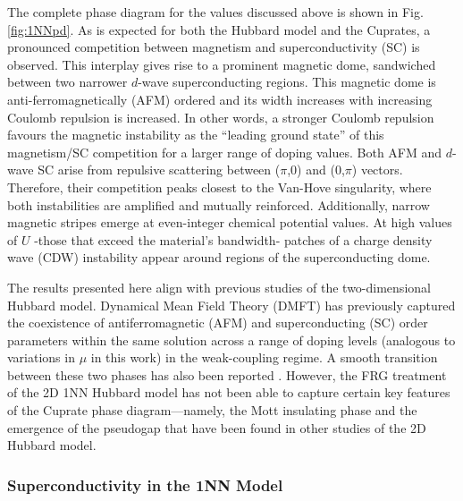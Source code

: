 \documentclass[12pt]{article}
\begin{document}
\medskip
\noindent The complete phase diagram for the values discussed above is shown in Fig.\ref{fig:1NNpd}. As is expected
for both the Hubbard model and the Cuprates\cite{kivelson1998electronic,fradkin2015colloquium,vanhala2018dynamical}, a pronounced competition between magnetism and 
superconductivity (SC) is observed. This interplay gives rise to a prominent magnetic dome, sandwiched between two narrower $d$-wave superconducting regions. This magnetic dome is 
anti-ferromagnetically (AFM) ordered and its width increases with increasing Coulomb repulsion is increased. In other words, a stronger Coulomb repulsion favours the magnetic instability as the ``leading ground state'' of this magnetism/SC competition 
for a larger range of doping values. Both AFM and $d$-wave SC arise from repulsive scattering between
($\pi$,0) and (0,$\pi$) vectors. Therefore, their competition peaks closest to the Van-Hove singularity, where both instabilities are amplified and mutually reinforced\cite{furukawa1998truncation,honerkamp2001temperature}.
Additionally, narrow magnetic stripes emerge at even-integer chemical potential values. At high values of $U$ -those that exceed the material's bandwidth- patches of a charge density wave (CDW) instability appear around regions of the superconducting dome.\par

\medskip

\noindent The results presented here align with previous studies of the two-dimensional Hubbard model. Dynamical Mean Field Theory (DMFT) has 
previously captured the coexistence of antiferromagnetic (AFM) and superconducting (SC) order parameters within the same solution across a range of doping levels (analogous to variations in 
$\mu$ in this work) in the weak-coupling regime\cite{capone2006competition}. A smooth transition between these two phases has also been reported \cite{capone2006competition}. However, the FRG treatment of the 2D 1NN Hubbard model has not been able to capture certain key features
of the Cuprate phase diagram—namely, the Mott insulating phase and the emergence of the pseudogap that have been found in other studies of the 2D Hubbard model\cite{katanin2009comparing,otsuki2014superconductivity}.






\subsubsection{Superconductivity in the 1NN Model}
\end{document}
